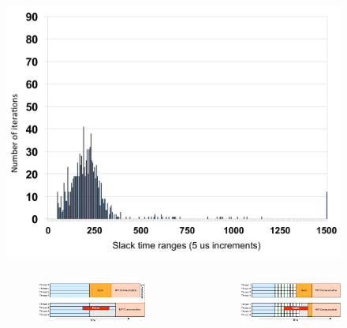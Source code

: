 \documentclass[serif,mathserif,final]{beamer}
\begin{document}
\begin{frame}{}
\begin{columns}[t]
\begin{column}{0.4\linewidth}
\begin{block}{}
        \begin{figure}[htb]
          \centering
          \includegraphics[width=.47\columnwidth]{images/Slack-Histogram-MPI-Allreduce-rank1}
          \caption{       } 
        \end{figure} 
       \begin{columns}[t]
          \begin{column}{0.01\columnwidth}\end{column}
         \begin{column}{0.98\columnwidth}
        \begin{columns}
          \begin{column}{0.47\columnwidth}
          \end{column}\begin{column}{0.40\columnwidth}
            \vspace{1ex}
            \begin{figure}[htb]
            \centering
           \includegraphics[width=0.8\columnwidth]{images/static-schedule}
            \end{figure}
          \end{column}\begin{column}{0.06\columnwidth}
          \end{column}\begin{column}{0.40\columnwidth}
            \begin{figure}[htb]
            \centering
            \includegraphics[width=0.8\columnwidth]{images/dynamic-schedule}

\end{figure}
\end{column}
\end{columns}
\end{column}
\end{columns}
\end{block}
\end{column}
\end{columns}
\end{frame}
\end{document}
